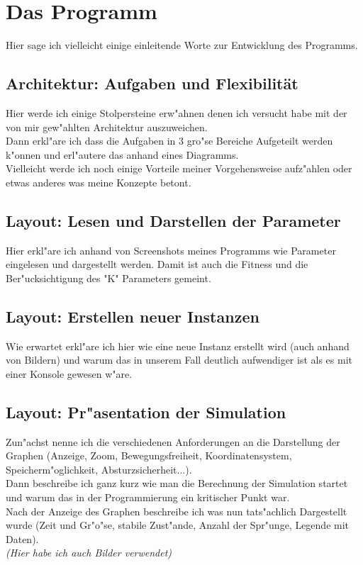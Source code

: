 \documentclass[11pt, a4paper, german]{article}
\begin{document}
\clearpage
\section{Das Programm}
Hier sage ich vielleicht einige einleitende Worte zur Entwicklung des Programms.

	\subsection{Architektur: Aufgaben und Flexibilität}
	Hier werde ich einige Stolpersteine erw"ahnen denen ich versucht habe mit der von mir gew"ahlten Architektur auszuweichen.\\
	Dann erkl"are ich dass die Aufgaben in 3 gro"se Bereiche Aufgeteilt werden k"onnen und erl"autere das anhand eines Diagramms.\\
	Vielleicht werde ich noch einige Vorteile meiner Vorgehensweise aufz"ahlen oder etwas anderes was meine Konzepte betont.
	
	\subsection{Layout: Lesen und Darstellen der Parameter}
	Hier erkl"are ich anhand von Screenshots meines Programms wie Parameter eingelesen und dargestellt werden. Damit ist auch die Fitness und die Ber"ucksichtigung des "{}K"{} Parameters gemeint.
	
	\subsection{Layout: Erstellen neuer Instanzen}
	Wie erwartet erkl"are ich hier wie eine neue Instanz erstellt wird (auch anhand von Bildern) und warum das in unserem Fall deutlich aufwendiger ist als es mit einer Konsole gewesen w"are.
	
	\subsection{Layout: Pr"asentation der Simulation}
	Zun"achst nenne ich die verschiedenen Anforderungen an die Darstellung der Graphen (Anzeige, Zoom, Bewegungsfreiheit, Koordinatensystem, Speicherm"oglichkeit, Absturzsicherheit...).\\
	Dann beschreibe ich ganz kurz wie man die Berechnung der Simulation startet und warum das in der Programmierung ein kritischer Punkt war.\\
	Nach der Anzeige des Graphen beschreibe ich was nun tats"achlich Dargestellt wurde (Zeit und Gr"o"se, stabile Zust"ande, Anzahl der Spr"unge, Legende mit Daten).\\
	\textit{(Hier habe ich auch Bilder verwendet)}
\end{document}

